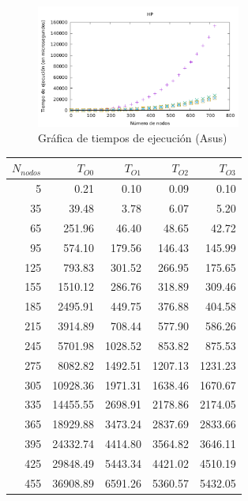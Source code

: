 \documentclass{homework}
\begin{document}
    \begin{figure}[H]
        \centering
        \includegraphics[width=0.6\textwidth]{../data/asus-opt.pdf}
        \caption{Gráfica de tiempos de ejecución (Asus)}
    \end{figure}

    \begin{table}[H]
        \centering
        \begin{tabular}{|r|r|r|r|r|}
            \hline
            $N_{nodos}$ & $T_{O0}$ & $T_{O1}$ & $T_{O2}$ & $T_{O3}$ \\
            \hline
            5 & 0.21 & 0.10 & 0.09 & 0.10 \\ 
            35 & 39.48 & 3.78 & 6.07 & 5.20 \\ 
            65 & 251.96 & 46.40 & 48.65 & 42.72 \\ 
            95 & 574.10 & 179.56 & 146.43 & 145.99 \\ 
            125 & 793.83 & 301.52 & 266.95 & 175.65 \\ 
            155 & 1510.12 & 286.76 & 318.89 & 309.46 \\ 
            185 & 2495.91 & 449.75 & 376.88 & 404.58 \\ 
            215 & 3914.89 & 708.44 & 577.90 & 586.26 \\ 
            245 & 5701.98 & 1028.52 & 853.82 & 875.53 \\ 
            275 & 8082.82 & 1492.51 & 1207.13 & 1231.23 \\ 
            305 & 10928.36 & 1971.31 & 1638.46 & 1670.67 \\ 
            335 & 14455.55 & 2698.91 & 2178.86 & 2174.05 \\ 
            365 & 18929.88 & 3473.24 & 2837.69 & 2833.66 \\ 
            395 & 24332.74 & 4414.80 & 3564.82 & 3646.11 \\ 
            425 & 29848.49 & 5443.34 & 4421.02 & 4510.19 \\ 
            455 & 36908.89 & 6591.26 & 5360.57 & 5432.05 \\ 

\end{tabular}
\end{table}
\end{document}
